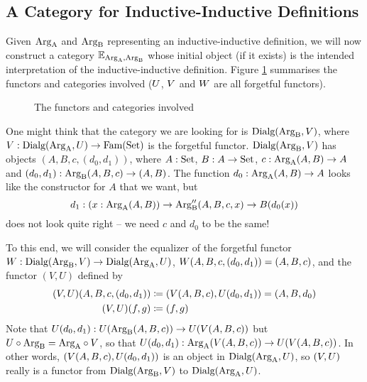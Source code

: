 \documentclass[orivec,envcountsame, ,envcountsect]{llncs}
\begin{document}
\subsection{A Category for Inductive-Inductive Definitions}

Given $\text{Arg}_{\text{A}}$ and $\text{Arg}_{\text{B}}$ representing an inductive-inductive
definition, we will now construct a category $\mathbb{E}_{\text{Arg}_{\text{A}}, \text{Arg}_{\text{B}}}$
whose initial object (if it exists) is the intended interpretation of
the inductive-inductive definition. Figure \ref{fig:map-of-functors}
summarises the functors and categories involved ($U$,
$V$ and $W$ are all forgetful functors).

\begin{figure}
  \centering
  \caption{The functors and categories involved}
  \label{fig:map-of-functors}
\end{figure}

One might think that the category we are looking for is
$\text{Dialg}(\text{Arg}_{\text{B}}, V)$, where $V :
\text{Dialg}(\text{Arg}_{\text{A}}, U) \to \text{Fam}(\text{Set})$ is the forgetful functor. $\text{Dialg}(\text{Arg}_{\text{B}}, V)$ has
objects $(A, B, c, (d_0, d_1))$, where $A : \text{Set}$, $B : A \to \text{Set}$,
$c : \text{Arg}_{\text{A}}(A, B) \to A$ and $(d_0, d_1) : \text{Arg}_{\text{B}}(A, B, c) \to (A, B)$.
The function $d_0 : \text{Arg}_{\text{A}}(A, B) \to A$ looks like the constructor for
$A$ that we want, but
\[
d_1 : (x : \text{Arg}_{\text{A}}(A, B)) \to \text{Arg}_{\text{B}}''(A, B, c,x) \to B(d_0(x))
\]
does not look quite right -- we need $c$ and $d_0$ to be the same!

To this end, we will consider the equalizer of the forgetful functor
$W : \text{Dialg}(\text{Arg}_{\text{B}}, V) \to
\text{Dialg}(\text{Arg}_{\text{A}}, U)$, $W(A, B, c, (d_0, d_1)) = (A, B, c)$, and the functor $(V, U)$ defined by 
\begin{align*}
  (V, U)(A, B, c, (d_0, d_1))
     &\coloneqq (V(A, B, c), U(d_0, d_1)) = (A, B, d_0) \\
  (V, U)(f, g)
     &\coloneqq (f, g)
\end{align*}
Note that $U(d_0, d_1) : U(\text{Arg}_{\text{B}}(A, B, c)) \to
U(V(A, B, c))$ but $U \circ \text{Arg}_{\text{B}} = \text{Arg}_{\text{A}}
\circ V$, so that $U(d_0, d_1) :
\text{Arg}_{\text{A}}(V(A, B, c)) \to U(V(A, B, c))$. In
other words, $(V(A, B, c), U(d_0, d_1))$ is an
object in $\text{Dialg}(\text{Arg}_{\text{A}}, U)$, so $(V, U)$
really is a functor from $\text{Dialg}(\text{Arg}_{\text{B}}, V)$ to
$\text{Dialg}(\text{Arg}_{\text{A}}, U)$.
\end{document}
